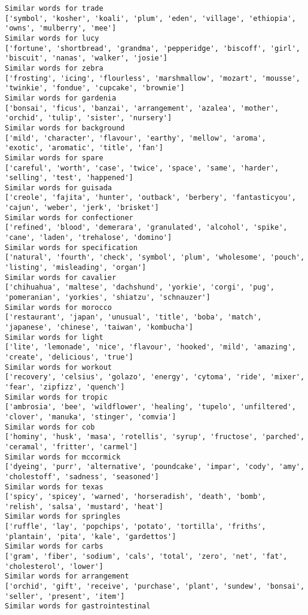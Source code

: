 \documentclass[11pt]{article}
\begin{document}
\begin{Verbatim}[commandchars=\\\{\}]
Similar words for trade
['symbol', 'kosher', 'koali', 'plum', 'eden', 'village', 'ethiopia', 'owns', 'mulberry', 'mee']
Similar words for lucy
['fortune', 'shortbread', 'grandma', 'pepperidge', 'biscoff', 'girl', 'biscuit', 'nanas', 'walker', 'josie']
Similar words for zebra
['frosting', 'icing', 'flourless', 'marshmallow', 'mozart', 'mousse', 'twinkie', 'fondue', 'cupcake', 'brownie']
Similar words for gardenia
['bonsai', 'ficus', 'banzai', 'arrangement', 'azalea', 'mother', 'orchid', 'tulip', 'sister', 'nursery']
Similar words for background
['mild', 'character', 'flavour', 'earthy', 'mellow', 'aroma', 'exotic', 'aromatic', 'title', 'fan']
Similar words for spare
['careful', 'worth', 'case', 'twice', 'space', 'same', 'harder', 'selling', 'test', 'happened']
Similar words for guisada
['creole', 'fajita', 'hunter', 'outback', 'berbery', 'fantasticyou', 'cajun', 'weber', 'jerk', 'brisket']
Similar words for confectioner
['refined', 'blood', 'demerara', 'granulated', 'alcohol', 'spike', 'cane', 'laden', 'trehalose', 'domino']
Similar words for specification
['natural', 'fourth', 'check', 'symbol', 'plum', 'wholesome', 'pouch', 'listing', 'misleading', 'organ']
Similar words for cavalier
['chihuahua', 'maltese', 'dachshund', 'yorkie', 'corgi', 'pug', 'pomeranian', 'yorkies', 'shiatzu', 'schnauzer']
Similar words for morocco
['restaurant', 'japan', 'unusual', 'title', 'boba', 'match', 'japanese', 'chinese', 'taiwan', 'kombucha']
Similar words for light
['lite', 'lemonade', 'nice', 'flavour', 'hooked', 'mild', 'amazing', 'create', 'delicious', 'true']
Similar words for workout
['recovery', 'celsius', 'golazo', 'energy', 'cytoma', 'ride', 'mixer', 'fear', 'zipfizz', 'quench']
Similar words for tropic
['ambrosia', 'bee', 'wildflower', 'healing', 'tupelo', 'unfiltered', 'clover', 'manuka', 'stinger', 'comvia']
Similar words for cob
['hominy', 'husk', 'masa', 'rotellis', 'syrup', 'fructose', 'parched', 'ceramal', 'fritter', 'carmel']
Similar words for mccormick
['dyeing', 'purr', 'alternative', 'poundcake', 'impar', 'cody', 'amy', 'cholestoff', 'sadness', 'seasoned']
Similar words for texas
['spicy', 'spicey', 'warned', 'horseradish', 'death', 'bomb', 'relish', 'salsa', 'mustard', 'heat']
Similar words for springles
['ruffle', 'lay', 'popchips', 'potato', 'tortilla', 'friths', 'plantain', 'pita', 'kale', 'gardettos']
Similar words for carbs
['gram', 'fiber', 'sodium', 'cals', 'total', 'zero', 'net', 'fat', 'cholesterol', 'lower']
Similar words for arrangement
['orchid', 'gift', 'receive', 'purchase', 'plant', 'sundew', 'bonsai', 'seller', 'present', 'item']
Similar words for gastrointestinal

\end{Verbatim}
\end{document}
